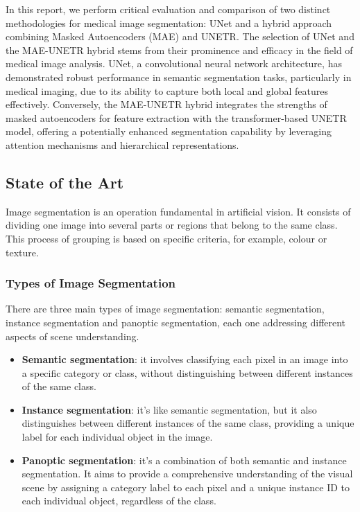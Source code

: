 In this report, we perform critical evaluation and comparison of two distinct methodologies for medical image segmentation: UNet\cite{ronneberger2015u} and a hybrid approach combining Masked Autoencoders (MAE)\cite{He_2022_CVPR} and UNETR\cite{hatamizadeh2022unetr}.
The selection of UNet and the MAE-UNETR hybrid stems from their prominence and efficacy in the field of medical image analysis. UNet, a convolutional neural network architecture, has demonstrated robust performance in semantic segmentation tasks, particularly in medical imaging, due to its ability to capture both local and global features effectively. Conversely, the MAE-UNETR hybrid integrates the strengths of masked autoencoders for feature extraction with the transformer-based UNETR model, offering a potentially enhanced segmentation capability by leveraging attention mechanisms and hierarchical representations.


\subsection{State of the Art}

Image segmentation is an operation fundamental in artificial vision. It consists of dividing one image into several parts or regions that belong to the same class. This process of grouping is based on specific criteria, for example, colour or texture.

\subsubsection*{Types of Image Segmentation} 
There are three main types of image segmentation: semantic segmentation, instance segmentation and panoptic segmentation, each one addressing different aspects of scene understanding. 
\begin{itemize}
    \item \textbf{Semantic segmentation}: it involves classifying each pixel in an image into a specific category or class, without distinguishing between different instances of the same class. 
    \item \textbf{Instance segmentation}: it's like semantic segmentation, but it also distinguishes between different instances of the same class, providing a unique label for each individual object in the image.
    \item \textbf{Panoptic segmentation}: it's a combination of both semantic and instance segmentation. It aims to provide a comprehensive understanding of the visual scene by assigning a category label to each pixel and a unique instance ID to each individual object, regardless of the class.
\end{itemize}

